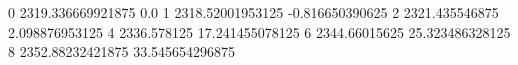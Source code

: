 0 2319.336669921875 0.0
1 2318.52001953125 -0.816650390625
2 2321.435546875 2.098876953125
4 2336.578125 17.241455078125
6 2344.66015625 25.323486328125
8 2352.88232421875 33.545654296875
